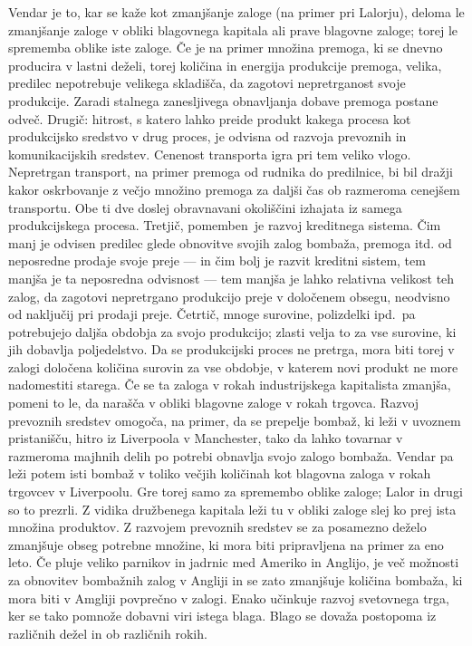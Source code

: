 \documentclass[kapital_02.tex]{subfiles}
\begin{document}
Vendar je to, kar se kaže kot zmanjšanje zaloge (na primer pri Lalorju), deloma le zmanjšanje zaloge v obliki blagovnega kapitala ali prave blagovne zaloge; torej le sprememba oblike iste zaloge.
Če je na primer množina premoga, ki se dnevno producira v lastni deželi, torej količina in energija produkcije premoga, velika, predilec nepotrebuje velikega skladišča, da zagotovi nepretrganost svoje produkcije.
Zaradi stalnega zanesljivega obnavljanja dobave premoga postane odveč.
Drugič: hitrost, s katero lahko preide produkt kakega procesa kot produkcijsko sredstvo v drug proces, je odvisna od razvoja prevoznih in komunikacijskih sredstev.
Cenenost transporta igra pri tem veliko vlogo.
Nepretrgan transport, na primer premoga od rudnika do predilnice, bi bil dražji kakor oskrbovanje z večjo množino premoga za daljši čas ob razmeroma cenejšem transportu.
Obe ti dve doslej obravnavani okoliščini izhajata iz samega produkcijskega procesa.
Tretjič, pomemben\KPEstran\ je razvoj kreditnega sistema.
Čim manj je odvisen predilec glede obnovitve svojih zalog bombaža, premoga itd. od neposredne prodaje svoje preje — in čim bolj je razvit kreditni sistem, tem manjša je ta neposredna odvisnost — tem manjša je lahko relativna velikost teh zalog, da zagotovi nepretrgano produkcijo preje v določenem obsegu, neodvisno od naključij pri prodaji preje.
Četrtič, mnoge surovine, polizdelki ipd.\ pa potrebujejo daljša obdobja za svojo produkcijo; zlasti velja to za vse surovine, ki jih dobavlja poljedelstvo.
Da se produkcijski proces ne pretrga, mora biti torej v zalogi določena količina surovin za vse obdobje, v katerem novi produkt ne more nadomestiti starega.
Če se ta zaloga v rokah industrijskega kapitalista zmanjša, pomeni to le, da narašča v obliki blagovne zaloge v rokah trgovca.
Razvoj prevoznih sredstev omogoča, na primer, da se prepelje bombaž, ki leži v uvoznem pristanišču, hitro iz Liverpoola v Manchester, tako da lahko tovarnar v razmeroma majhnih delih po potrebi obnavlja svojo zalogo bombaža.
Vendar pa leži potem isti bombaž v toliko večjih količinah kot blagovna zaloga v rokah trgovcev v Liverpoolu.
Gre torej samo za spremembo oblike zaloge; Lalor in drugi so to prezrli.
Z vidika družbenega kapitala leži tu v obliki zaloge slej ko prej ista množina produktov.
Z razvojem prevoznih sredstev se za posamezno deželo zmanjšuje obseg potrebne množine, ki mora biti pripravljena na primer za eno leto.
Če pluje veliko parnikov in jadrnic med Ameriko in Anglijo, je več možnosti za obnovitev bombažnih zalog v Angliji in se zato zmanjšuje količina bombaža, ki mora biti v Amgliji povprečno v zalogi.
Enako učinkuje razvoj svetovnega trga, ker se tako pomnože dobavni viri istega blaga.
Blago se dovaža postopoma iz različnih dežel in ob različnih rokih.
\end{document}
